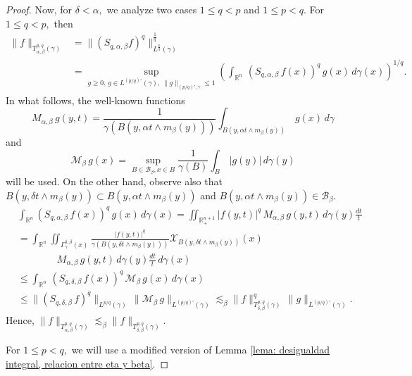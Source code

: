 \documentclass[leqno,11pt]{amsart}
\theoremstyle{plain}
\theoremstyle{remark}
\begin{document}
{\begin{proof}
Now, for $\delta < \alpha,$ we analyze two cases $1\le q<p$ and $1\le p<q.$
For $1\le q<p,$ then \begin{align*}
\|f\|_{T^{p,q}_{\alpha, \beta}(\gamma)}&= \|(S_{q,\alpha, \beta}f)^q\|_{L^{\frac{p}{q}}(\gamma)}^{\frac{1}{q}}\\ &=\sup_{
g\ge 0,\, g\in L^{\left(p/q\right)'}(\gamma),\, \|g\|_{\left(p/q\right)', \gamma}\le 1}\left(\int_{\mathbb{R}^n}\, (S_{q,\alpha, \beta}\, f(x))^q\, g(x)\, d\gamma(x)\right)^{1/q}.
\end{align*}
In what follows, the well-known functions $$M_{\alpha, \beta}\, g(y,t)=\frac{1}{\gamma(B(y, \alpha t\wedge m_\beta (y)))}\int_{B(y,\alpha t \wedge m_\beta(y))}\, g(x)\, d\gamma$$ and $$\displaystyle \mathcal{M}_\beta\, g (x)=\sup_{B\in \mathscr{B}_\beta, x\in B}\frac{1}{\gamma(B)}\int_B\, |g(y)|\, d\gamma(y)$$ will be used. On the other hand, observe also that $B(y,\delta t \wedge m_\beta (y))\subset B(y, \alpha t\wedge m_\beta (y))$ and $B(y, \alpha t\wedge m_\beta (y))\in \mathscr{B}_\beta.$
\begin{align*}
&\int_{\mathbb{R}^n} (S_{q,\alpha,\beta}\,  f(x))^q\, g(x)\, d\gamma(x) = \iint_{\mathbb{R}^{n+1}_+}|f(y,t)|^q\, M_{\alpha, \beta}\, g(y,t)\, d\gamma(y)\frac{dt}{t}\\  &= \int_{\mathbb{R}^n}\iint_{\Gamma^{\delta, \beta}_\gamma(x)}\frac{|f(y,t)|^q}{\gamma(B(y, \delta t\wedge m_\beta(y)))}  \mathcal{X}_{B(y, \delta t\wedge m_\beta (y))}(x)\\ & \qquad \qquad M_{\alpha, \beta}\, g(y,t)\, d\gamma(y)\frac{dt}{t}\, d\gamma(x)\\ &\le \int_{\mathbb{R}^n}\, (S_{q,\delta, \beta}\, f(x))^q\, \mathcal{M}_\beta\, g(x)\, d\gamma(x)\\ &\le \|(S_{q,\delta, \beta}\, f)^q\|_{L^{p/q}(\gamma)} \, \|\mathcal{M}_\beta\, g\|_{L^{(p/q)'}(\gamma)}\lesssim_\beta \|f\|^q_{T^{p,q}_{\delta,\beta}(\gamma)}\, \|g\|_{L^{(p/q)'}(\gamma)}.
\end{align*}
Hence, $\|f\|_{T^{p,q}_{\alpha, \beta}(\gamma)}\lesssim_\beta \|f\|_{T^{p,q}_{\delta, \beta}(\gamma)}.$

For $1\le p<q,$ we will use a modified version of Lemma \ref{lema: desigualdad integral, relacion entre eta y beta}.


\end{proof}}
\end{document}
